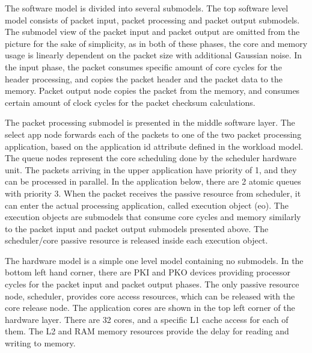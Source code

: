 
The software model is divided into several submodels. The top software level model consists of packet input, packet processing and packet output submodels. The submodel view of the packet input and packet output are omitted from the picture for the sake of simplicity, as in both of these phases, the core and memory usage is linearly dependent on the packet size with additional Gaussian noise. In the input phase, the packet consumes specific amount of core cycles for the header processing, and copies the packet header and the packet data to the memory. Packet output node copies the packet from the memory, and consumes certain amount of clock cycles for the packet checksum calculations.

The packet processing submodel is presented in the middle software layer. The select app node forwards each of the packets to one of the two packet processing application, based on the application id attribute defined in the workload model. The queue nodes represent the core scheduling done by the scheduler hardware unit. The packets arriving in the upper application have priority of 1, and they can be processed in parallel. In the application below, there are 2 atomic queues with priority 3. When the packet receives the passive resource from scheduler, it can enter the actual processing application, called execution object (eo). The execution objects are submodels that consume core cycles and memory similarly to the packet input and packet output submodels presented above. The scheduler/core passive resource is released inside each execution object.

The hardware model is a simple one level model containing no submodels. In the bottom left hand corner, there are PKI and PKO devices providing processor cycles for the packet input and packet output phases. The only passive resource node, scheduler, provides core access resources, which can be released with the core release node. The application cores are shown in the top left corner of the hardware layer. There are 32 cores, and a specific L1 cache access for each of them. The L2 and RAM memory resources provide the delay for reading and writing to memory.

